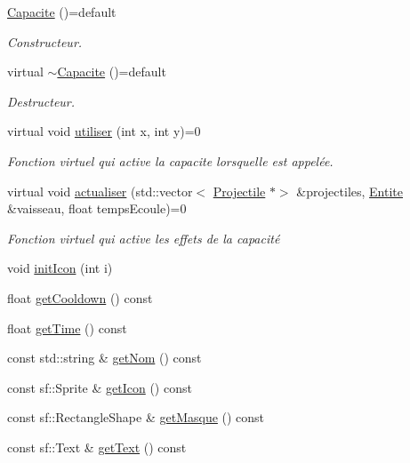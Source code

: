 \begin{DoxyCompactItemize}
\item 
\hyperlink{class_capacite_a8a1aebc5b2332e366a3f207c23b4d363}{Capacite} ()=default
\begin{DoxyCompactList}\small\item\em Constructeur. \end{DoxyCompactList}\item 
virtual \hyperlink{class_capacite_a43be1570a24a64682ff3f034330779a9}{$\sim$\+Capacite} ()=default
\begin{DoxyCompactList}\small\item\em Destructeur. \end{DoxyCompactList}\item 
virtual void \hyperlink{class_capacite_a6f5e6efda11f80ab8538e23f5bdc6e79}{utiliser} (int x, int y)=0
\begin{DoxyCompactList}\small\item\em Fonction virtuel qui active la capacite lorsqu\textquotesingle{}elle est appelée. \end{DoxyCompactList}\item 
virtual void \hyperlink{class_capacite_a75c9621d7a704fedb10ad29c6a697d64}{actualiser} (std\+::vector$<$ \hyperlink{class_projectile}{Projectile} $\ast$$>$ \&projectiles, \hyperlink{class_entite}{Entite} \&vaisseau, float temps\+Ecoule)=0
\begin{DoxyCompactList}\small\item\em Fonction virtuel qui active les effets de la capacité \end{DoxyCompactList}\item 
void \hyperlink{class_capacite_aba7e297324570300fe7786dddb8c05ef}{init\+Icon} (int i)
\item 
float \hyperlink{class_capacite_a8b7b9b75b737fa5ef94997de294b84aa}{get\+Cooldown} () const
\item 
float \hyperlink{class_capacite_abb50c03553bc0b08585c3886c0a22656}{get\+Time} () const
\item 
const std\+::string \& \hyperlink{class_capacite_a36ba3cb1e9a72586dff32fa7f0df85cf}{get\+Nom} () const
\item 
const sf\+::\+Sprite \& \hyperlink{class_capacite_aa66c20bba4433f871c91c3836a0c1929}{get\+Icon} () const
\item 
const sf\+::\+Rectangle\+Shape \& \hyperlink{class_capacite_a4585b46b989301b127a93dc062a0b8aa}{get\+Masque} () const
\item 
const sf\+::\+Text \& \hyperlink{class_capacite_a91f1a5f98354c08f75caf99b0513d3c4}{get\+Text} () const
$$
\end{DoxyCompactItemize}
